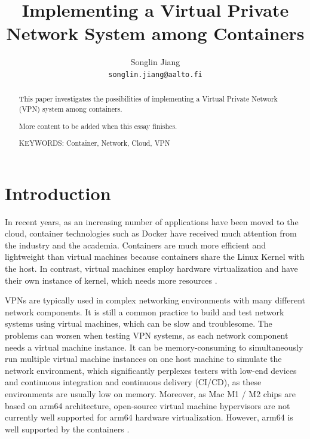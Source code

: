 \documentclass[article]{aaltoseries}
\begin{document}
 

\title{Implementing a Virtual Private Network System among Containers}

\author{Songlin Jiang%
\\\textnormal{\texttt{songlin.jiang@aalto.fi}}} %


\maketitle


\begin{abstract}
This paper investigates the possibilities of implementing a Virtual Private Network (VPN) system among containers.

More content to be added when this essay finishes.

\vspace{3mm}
\noindent KEYWORDS: Container, Network, Cloud, VPN

\end{abstract}




\section{Introduction}

In recent years, as an increasing number of applications have been moved to the cloud, container technologies such as Docker have received much attention from the industry and the academia. Containers are much more efficient and lightweight than virtual machines because containers share the Linux Kernel with the host. In contrast, virtual machines employ hardware virtualization and have their own instance of kernel, which needs more resources \cite{10.1145/2988336.2988337}.

VPNs are typically used in complex networking environments with many different network components. It is still a common practice \cite{9151942} to build and test network systems using virtual machines, which can be slow and troublesome. The problems can worsen when testing VPN systems, as each network component needs a virtual machine instance. It can be memory-consuming to simultaneously run multiple virtual machine instances on one host machine to simulate the network environment, which significantly perplexes testers with low-end devices and continuous integration and continuous delivery (CI/CD), as these environments are usually low on memory. Moreover, as Mac M1 / M2 chips are based on arm64 architecture, open-source virtual machine hypervisors are not currently well supported for arm64 hardware virtualization. However, arm64 is well supported by the containers \cite{9852232}.
\end{document}
